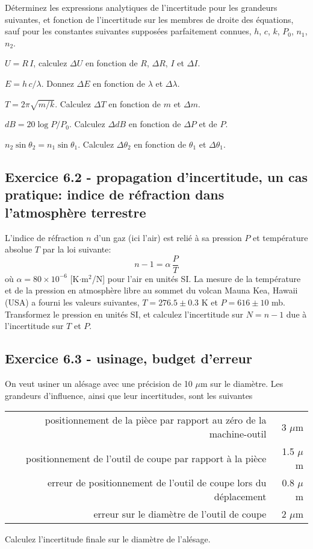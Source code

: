 \documentclass[main.tex]{subfiles}
\begin{document}
Déterminez les expressions analytiques de l'incertitude pour les grandeurs suivantes, et fonction de l'incertitude sur les membres de droite des équations, sauf pour les constantes suivantes supposées parfaitement connues, $h$, $c$, $k$, $P_0$, $n_1$, $n_2$.
\begin{description}\renewcommand{\labelitemi}{$\bullet$}
    \item[loi d'Ohm] $U=R\,I$, calculez $\Delta U$ en fonction de $R$, $\Delta R$, $I$ et $\Delta I$.
    \item[Energie du photon] $E=h\,c/\lambda$. Donnez $\Delta E$ en fonction de $\lambda$ et $\Delta\lambda$.
    \item[Période d'oscillation masse et ressort] $T=2\pi\sqrt{m/k}$. Calculez $\Delta T$ en fonction de $m$ et $\Delta m$.
    \item[Décibels et puissance] $dB=20\log{P/P_0}$. Calculez $\Delta dB$ en fonction de $\Delta P$ et de $P$.
    \item[Loi de Snell (optique)] $n_2\sin{\theta_2}=n_1\sin{\theta_1}$. Calculez $\Delta\theta_2$ en fonction de $\theta_1$ et $\Delta\theta_1$.
\end{description}

\subsection*{Exercice 6.2 - propagation d'incertitude, un cas pratique: indice de réfraction dans l'atmosphère terrestre}

L'indice de réfraction $n$ d'un gaz (ici l'air) est relié à sa pression $P$ et température absolue $T$ par la loi suivante:
$$
    n-1=\alpha\,\frac{P}{T}
$$
où $\alpha=80\times10^{-6}$ [K$\cdot$m$^2$/N] pour l'air en unités SI. La mesure de la température et de la pression en atmosphère libre au sommet du volcan Mauna Kea, Hawaii (USA) a fourni les valeurs suivantes, $T=276.5\pm0.3$ K et $P=616\pm10$ mb. Transformez le pression en unités SI, et calculez l'incertitude sur $N=n-1$ due à l'incertitude sur $T$ et $P$.

\subsection*{Exercice 6.3 - usinage, budget d'erreur}

On veut usiner un alésage avec une précision de 10 $\mu$m sur le diamètre. Les grandeurs d'influence, ainsi que leur incertitudes, sont les suivantes
\begin{center}
    \begin{tabular}{r|r}
        positionnement de la pièce par rapport au zéro de la machine-outil & 3 $\mu$m   \\
        positionnement de l'outil de coupe par rapport à la pièce          & 1.5 $\mu$m \\
        erreur de positionnement de l'outil de coupe lors du déplacement   & 0.8 $\mu$m \\
        erreur sur le diamètre de l'outil de coupe                         & 2 $\mu$m
    \end{tabular}
\end{center}
Calculez l'incertitude finale sur le diamètre de l'alésage.
\end{document}
